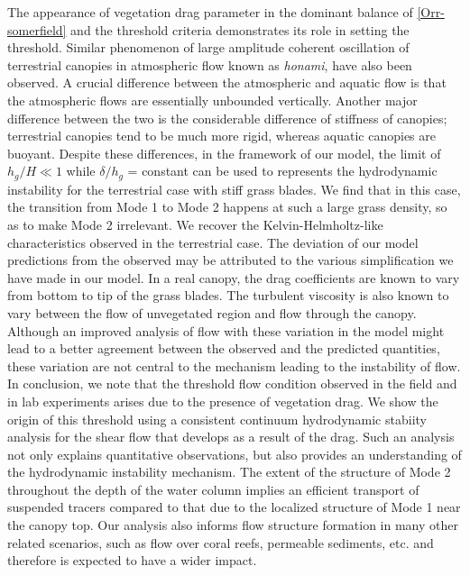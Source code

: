\documentclass[aps,prl,twocolumn,superscriptaddress,10pt]{revtex4-1}  %
\newcommand{\hg}{h_g}
\begin{document}
The appearance of vegetation drag parameter in the dominant balance of \eqref{Orr-somerfield} and the threshold criteria demonstrates its role in setting the threshold.
\newline
Similar phenomenon of large amplitude coherent oscillation of terrestrial canopies in atmospheric flow known as \textit{honami}\cite{Inoue56,Raupach96}, have also been observed.
A crucial difference between the atmospheric and aquatic flow is that the atmospheric flows are essentially unbounded vertically\cite{Vivoni98,Nepf00}. 
Another major difference between the two is the considerable difference of stiffness of canopies; terrestrial canopies tend to be much more rigid, whereas aquatic canopies are buoyant\cite{Vivoni98,Ghisal02}. 
Despite these differences, in the framework of our model, the limit of $\hg/H \ll 1$ while $\delta/\hg$ = constant can be used to represents the hydrodynamic instability for the terrestrial case with stiff grass blades. We find that in this case, the transition from Mode 1 to Mode 2 happens at such a large grass density, so as to make Mode 2 irrelevant. We recover the Kelvin-Helmholtz-like characteristics observed in the terrestrial case. 
\newline
The deviation of our model predictions from the observed may be attributed to the various simplification we have made in our model. 
In a real canopy, the drag coefficients are known to vary from bottom to tip of the grass blades\cite{Vivoni98,Nepf00}. 
The turbulent viscosity is also known to vary between the flow of unvegetated region and flow through the canopy\cite{Ghisal02}. 
Although an improved analysis of flow with these variation in the model might lead to a better agreement between the observed and the predicted quantities, these variation are not central to the mechanism leading to the instability of flow.
\newline\newline
In conclusion, we note that the threshold flow condition observed in the field and in lab experiments arises due to the presence of vegetation drag. 
We show the origin of this threshold using a consistent continuum hydrodynamic stabiity analysis for the shear flow that develops as a result of the drag. 
Such an analysis not only explains quantitative observations, but also provides an understanding of the hydrodynamic instability mechanism. 
The extent of the structure of Mode 2 throughout the depth of the water column implies an efficient transport of suspended tracers compared to that due to the localized structure of Mode 1 near the canopy top. 
Our analysis also informs flow structure formation in many other related scenarios, such as flow over coral reefs, permeable sediments, etc. and therefore is expected to have a wider impact.
{}

\end{document}
